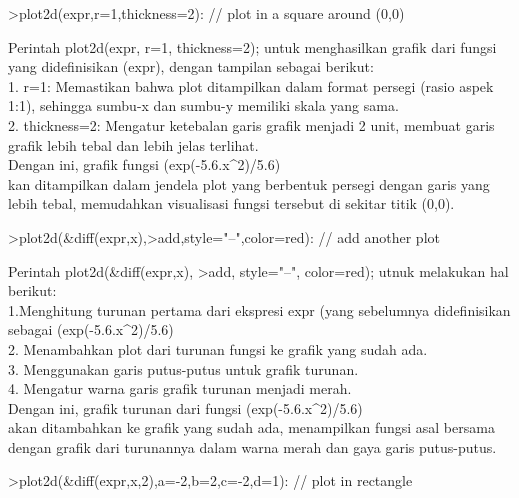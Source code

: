\documentclass{article}
\begin{document}
\begin{eulernotebook}
\begin{eulercomment}
\begin{eulercomment}
\begin{eulercomment}
\begin{eulercomment}
\begin{eulercomment}
\end{eulercomment}
\begin{eulerprompt}
>plot2d(expr,r=1,thickness=2): // plot in a square around (0,0)
\end{eulerprompt}
\begin{eulercomment}
Perintah plot2d(expr, r=1, thickness=2); untuk menghasilkan grafik
dari fungsi yang didefinisikan (expr), dengan tampilan sebagai
berikut:\\
1. r=1: Memastikan bahwa plot ditampilkan dalam format persegi (rasio
aspek 1:1), sehingga sumbu-x dan sumbu-y memiliki skala yang sama.\\
2. thickness=2: Mengatur ketebalan garis grafik menjadi 2 unit,
membuat garis grafik lebih tebal dan lebih jelas terlihat.\\
Dengan ini, grafik fungsi (exp(-5.6.x\textasciicircum{}2)/5.6)\\
kan ditampilkan dalam jendela plot yang berbentuk persegi dengan garis
yang lebih tebal, memudahkan visualisasi fungsi tersebut di sekitar
titik (0,0).
\end{eulercomment}
\begin{eulerprompt}
>plot2d(&diff(expr,x),>add,style="--",color=red): // add another plot
\end{eulerprompt}
\begin{eulercomment}
Perintah plot2d(\&diff(expr,x), \textgreater{}add, style="--", color=red); utnuk
melakukan hal berikut:\\
1.Menghitung turunan pertama dari ekspresi expr (yang sebelumnya
didefinisikan sebagai (exp(-5.6.x\textasciicircum{}2)/5.6)\\
2. Menambahkan plot dari turunan fungsi ke grafik yang sudah ada.\\
3. Menggunakan garis putus-putus untuk grafik turunan.\\
4. Mengatur warna garis grafik turunan menjadi merah.\\
Dengan ini, grafik turunan dari fungsi (exp(-5.6.x\textasciicircum{}2)/5.6)\\
akan ditambahkan ke grafik yang sudah ada, menampilkan fungsi asal
bersama dengan grafik dari turunannya dalam warna merah dan gaya garis
putus-putus.
\end{eulercomment}
\begin{eulerprompt}
>plot2d(&diff(expr,x,2),a=-2,b=2,c=-2,d=1): // plot in rectangle
\end{eulerprompt}

\end{eulercomment}
\end{eulercomment}
\end{eulercomment}
\end{eulercomment}
\end{eulernotebook}
\end{document}
